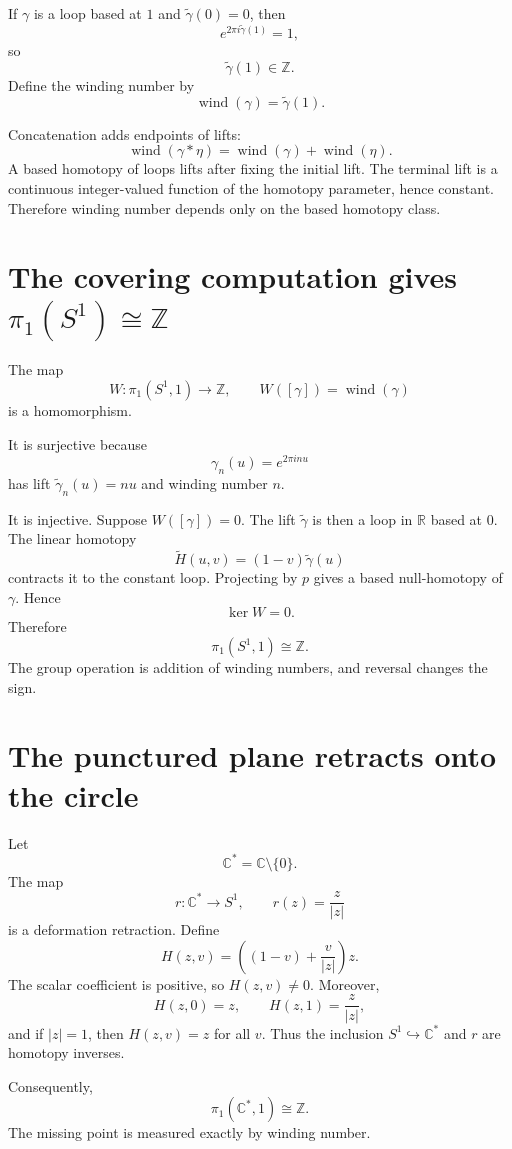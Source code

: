 If \(\gamma\) is a loop based at \(1\) and \(\widetilde\gamma(0)=0\), then
\[
  e^{2\pi i\widetilde\gamma(1)}=1,
\]
so
\[
  \widetilde\gamma(1)\in\mathbb Z.
\]
Define the winding number by
\[
  \operatorname{wind}(\gamma)=\widetilde\gamma(1).
\]

Concatenation adds endpoints of lifts:
\[
  \operatorname{wind}(\gamma*\eta)
  =\operatorname{wind}(\gamma)+\operatorname{wind}(\eta).
\]
A based homotopy of loops lifts after fixing the initial lift.  The terminal lift is a continuous integer-valued function of the homotopy parameter, hence constant.  Therefore winding number depends only on the based homotopy class.

\section{The covering computation gives \texorpdfstring{$\pi_1(S^1)\cong\mathbb Z$}{pi1(S1)=Z}}

The map
\[
  W:\pi_1(S^1,1)\to\mathbb Z,
  \qquad
  W([\gamma])=\operatorname{wind}(\gamma)
\]
is a homomorphism.

It is surjective because
\[
  \gamma_n(u)=e^{2\pi i n u}
\]
has lift \(\widetilde\gamma_n(u)=nu\) and winding number \(n\).

It is injective.  Suppose \(W([\gamma])=0\).  The lift \(\widetilde\gamma\) is then a loop in \(\mathbb R\) based at \(0\).  The linear homotopy
\[
  \widetilde H(u,v)=(1-v)\widetilde\gamma(u)
\]
contracts it to the constant loop.  Projecting by \(p\) gives a based null-homotopy of \(\gamma\).  Hence
\[
  \ker W=0.
\]
Therefore
\[
  \boxed{\pi_1(S^1,1)\cong\mathbb Z.}
\]
The group operation is addition of winding numbers, and reversal changes the sign.

\section{The punctured plane retracts onto the circle}

Let
\[
  \mathbb C^*=\mathbb C\setminus\{0\}.
\]
The map
\[
  r:\mathbb C^*\to S^1,
  \qquad
  r(z)=\frac z{|z|}
\]
is a deformation retraction.  Define
\[
  H(z,v)=\left((1-v)+\frac v{|z|}\right)z.
\]
The scalar coefficient is positive, so \(H(z,v)\ne0\).  Moreover,
\[
  H(z,0)=z,
  \qquad
  H(z,1)=\frac z{|z|},
\]
and if \(|z|=1\), then \(H(z,v)=z\) for all \(v\).  Thus the inclusion \(S^1\hookrightarrow\mathbb C^*\) and \(r\) are homotopy inverses.

Consequently,
\[
  \boxed{\pi_1(\mathbb C^*,1)\cong\mathbb Z.}
\]
The missing point is measured exactly by winding number.

